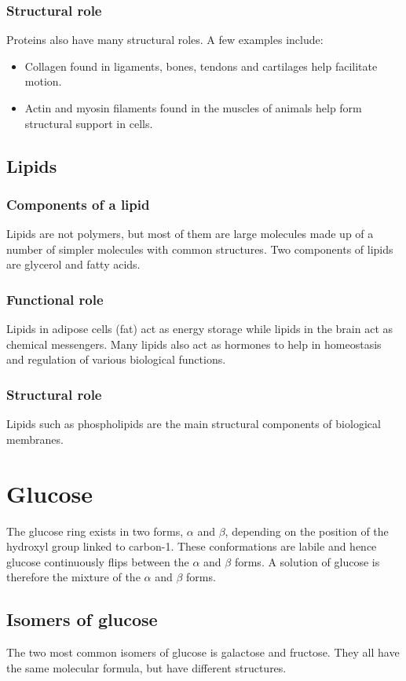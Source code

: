 \documentclass[11pt]{article}
\begin{document}
\subsubsection{Structural role}
\label{sec:orgeb971a4}
Proteins also have many structural roles. A few examples include:
\begin{itemize}
\item Collagen found in ligaments, bones, tendons and cartilages help facilitate motion.
\item Actin and myosin filaments found in the muscles of animals help form structural support in cells.
\end{itemize}
\subsection{Lipids}
\label{sec:orgfbd7348}

\subsubsection{Components of a lipid}
\label{sec:orgbef2b5c}
Lipids are not polymers, but most of them are large molecules made up of a number of simpler molecules with common structures. Two components of lipids are glycerol and fatty acids.
\subsubsection{Functional role}
\label{sec:org41386d9}
Lipids in adipose cells (fat) act as energy storage while lipids in the brain act as chemical messengers. Many lipids also act as hormones to help in homeostasis and regulation of various biological functions.
\subsubsection{Structural role}
\label{sec:org88b16e7}
Lipids such as phospholipids are the main structural components of biological membranes.
\section{Glucose}
\label{sec:org7b8477b}
The glucose ring exists in two forms, \(\alpha\) and \(\beta\), depending on the position of the hydroxyl group linked to carbon-1. These conformations are labile and hence glucose continuously flips between the \(\alpha\) and \(\beta\) forms. A solution of glucose is therefore the mixture of the \(\alpha\) and \(\beta\) forms.
\subsection{Isomers of glucose}
\label{sec:orgccef9f2}
The two most common isomers of glucose is galactose and fructose. They all have the same molecular formula, but have different structures.
\end{document}

